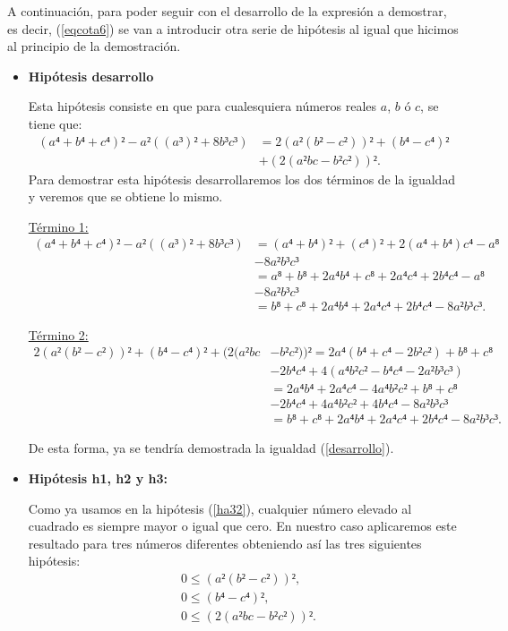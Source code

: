 \begin{demostracion}
  A continuación, para poder seguir con el desarrollo de la expresión a
  demostrar, es decir, (\ref{eqcota6}) se van a introducir otra serie de
  hipótesis al igual que hicimos al principio de la demostración.
  \begin{itemize}
  \item \textbf{Hipótesis desarrollo}

    Esta hipótesis consiste en que para cualesquiera números reales \(a\),
    \(b\) ó \(c\), se tiene que:
    \begin{align*}\label{desarrollo}\tag{desarrollo}
      (a⁴+b⁴+c⁴)²-a²((a³)²+8b³c³)&=2(a²(b²-c²))²+(b⁴-c⁴)²\\
      &+(2(a²bc-b²c²))².
    \end{align*}
    Para demostrar esta hipótesis desarrollaremos los dos términos de la
    igualdad y veremos que se obtiene lo mismo.

    \underline{Término 1:}
    \begin{align*}
      (a⁴+b⁴+c⁴)²-a²((a³)²+8b³c³)&=(a⁴+b⁴)²+(c⁴)²+2(a⁴+b⁴)c⁴-a⁸\\
      &-8a²b³c³\\
                                 &=a⁸+b⁸+2a⁴b⁴+c⁸+2a⁴c⁴+2b⁴c⁴-a⁸\\
                                   &-8a²b³c³\\
      &=b⁸+c⁸+2a⁴b⁴+2a⁴c⁴+2b⁴c⁴-8a²b³c³.
    \end{align*}

    \underline{Término 2:}
    \begin{align*}
      2(a²(b²-c²))²+(b⁴-c⁴)²+(2(a²bc&-b²c²))²=2a⁴(b⁴+c⁴-2b²c²)+b⁸+c⁸\\
                                         &-2b⁴c⁴+4(a⁴b²c²-b⁴c⁴-2a²b³c³)\\
                                         &=2a⁴b⁴+2a⁴c⁴-4a⁴b²c²+b⁸+c⁸\\
                                         &-2b⁴c⁴+4a⁴b²c²+4b⁴c⁴-8a²b³c³\\
                                    &=b⁸+c⁸+2a⁴b⁴+2a⁴c⁴+2b⁴c⁴-8a²b³c³.
    \end{align*}

    De esta forma, ya se tendría demostrada la igualdad (\ref{desarrollo}).

  \item \textbf{Hipótesis h1, h2 y h3:}

    Como ya usamos en la hipótesis (\ref{ha32}), cualquier número
    elevado al cuadrado es siempre mayor o igual que cero. En nuestro caso
    aplicaremos este resultado para tres números diferentes obteniendo
    así las tres siguientes hipótesis:
    \begin{align}
      &0≤(a²(b²-c²))²,\label{h1cota}\tag{h1}\\ 
      &0≤(b⁴-c⁴)², \label{h2cota}\tag{h2}\\
      &0≤(2(a²bc-b²c²))².\label{h3cota}\tag{h3}
    \end{align}


\end{itemize}
\end{demostracion}

